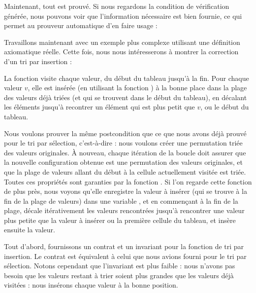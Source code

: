 


Maintenant, tout est prouvé. Si nous regardons la condition de vérification générée,
nous pouvons voir que l'information nécessaire est bien fournie, ce qui permet
au prouveur automatique d'en faire usage :






Travaillons maintenant avec un exemple plus complexe utilisant une définition
axiomatique réelle. Cette fois, nous nous intéresserons à montrer la correction
d'un tri par insertion :




La fonction  visite chaque valeur, du début du tableau
jusqu'à la fin. Pour chaque valeur $v$, elle est insérée (en utilisant la fonction
) à la bonne place dans la plage des valeurs déjà triées (et qui
se trouvent dans le début du tableau), en décalant les éléments jusqu'à
recontrer un élément qui est plus petit que $v$, ou le début du tableau.



Nous voulons prouver la même postcondition que ce que nous avons déjà prouvé pour
le tri par sélection, c'est-à-dire : nous voulons créer une permutation triée des
valeurs originales. À nouveau, chaque itération de la boucle doit assurer que la
nouvelle configuration obtenue est une permutation des valeurs originales, et que
la plage de valeurs allant du début à la cellule actuellement visitée est triée.
Toutes ces propriétés sont garanties par la fonction . Si l'on
regarde cette fonction de plus près, nous voyons qu'elle enregistre la
valeur à insérer (qui se trouve à la fin de la plage de valeurs) dans une variable
, et en commençant à la fin de la plage, décale itérativement
les valeurs rencontrées jusqu'à rencontrer une valeur plus petite que la valeur à
insérer ou la première cellule du tableau, et insère ensuite la valeur.




Tout d'abord, fournissons un contrat et un invariant pour la fonction de tri
par insertion. Le contrat est équivalent à celui que nous avions fourni pour le
tri par sélection. Notons cependant que l'invariant est plus faible : nous
n'avons pas besoin que les valeurs restant à trier soient plus grandes que les
valeurs déjà visitées : nous insérons chaque valeur à la bonne position.



